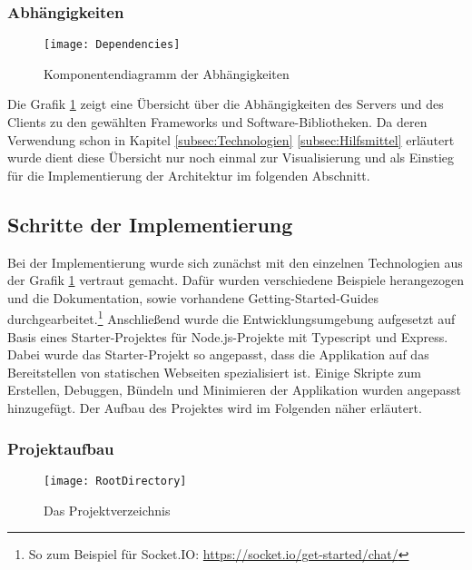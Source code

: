 \subsubsection{Abhängigkeiten}
\begin{figure}[htp]
	\centering
	\captionsetup{justification=centering}
	\texttt{[image: Dependencies]}
	\caption[Abhängigkeiten]{Komponentendiagramm der Abhängigkeiten}
	\label{fig:ComponentDependencies}
\end{figure}
\noindent Die Grafik \ref{fig:ComponentDependencies} zeigt eine Übersicht über die Abhängigkeiten des Servers und des Clients zu den gewählten Frameworks und Software-Bibliotheken. Da deren Verwendung schon in Kapitel \ref{subsec:Technologien} \bzw \ref{subsec:Hilfsmittel} erläutert wurde dient diese Übersicht nur noch einmal zur Visualisierung und als Einstieg für die Implementierung der Architektur im folgenden Abschnitt.

\subsection{Schritte der Implementierung}
\label{subsec:Implementierung}

Bei der Implementierung wurde sich zunächst mit den einzelnen Technologien aus der Grafik \ref{fig:ComponentDependencies} vertraut gemacht. Dafür wurden verschiedene Beispiele herangezogen und die Dokumentation, sowie \ggf vorhandene Getting-Started-Guides durchgearbeitet.\footnote{So zum Beispiel für Socket.IO: \url{https://socket.io/get-started/chat/}}
Anschließend wurde die Entwicklungsumgebung aufgesetzt auf Basis eines Starter-Projektes für Node.js-Projekte mit Typescript und Express.\cite{typescript_node_starter} Dabei wurde das Starter-Projekt so angepasst, dass die Applikation auf das Bereitstellen von statischen Webseiten spezialisiert ist. Einige Skripte zum Erstellen, Debuggen, Bündeln und Minimieren der Applikation wurden angepasst \bzw hinzugefügt. Der Aufbau des Projektes wird im Folgenden näher erläutert.

\subsubsection{Projektaufbau}

\begin{figure}[htp]
	\centering
	\captionsetup{justification=centering}
	\texttt{[image: RootDirectory]}
	\caption[Projektverzeichnis]{Das Projektverzeichnis}
	\label{fig:RootDirectory}
\end{figure}

